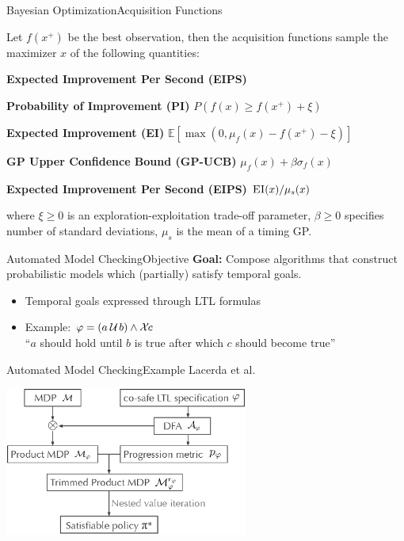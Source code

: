 \begin{frame}{Bayesian Optimization}{Acquisition Functions}

Let $f(x^+)$ be the best observation, then the acquisition functions sample the maximizer $x$ of the following quantities:

\begin{labeling}{\textbf{Expected Improvement Per Second (EIPS)}}
	\item[\textbf{Probability of Improvement (PI)}] $P(f(x) \geq f(x^+) + \xi)$
	\item[\textbf{Expected Improvement (EI)}] $\mathbb{E}[\max(0, \mu_f(x) - f(x^+) - \xi)]$
	\item[\textbf{GP Upper Confidence Bound (GP-UCB)}] $\mu_f(x) + \beta\sigma_f(x)$
	\item[\textbf{Expected Improvement Per Second (EIPS)}] $\textsc{EI}(x) / \mu_s(x)$
\end{labeling}

where $\xi \geq 0$ is an exploration-exploitation trade-off parameter, $\beta \geq 0$ specifies number of standard deviations, $\mu_s$ is the mean of a timing GP.
	
\end{frame}

\begin{frame}{Automated Model Checking}{Objective}
\textbf{Goal:} Compose algorithms that construct probabilistic models which (partially) satisfy temporal goals.

\begin{itemize}
	\item Temporal goals expressed through LTL formulas
	\item Example: $\varphi = (a \mathbin{\mathcal{U}\kern-.1em} b) \wedge \mathbin{\mathcal{X}\kern-.1em} c$ \\ ``$a$ should hold until $b$ is true after which $c$ should become true''
\end{itemize}
\end{frame}

\begin{frame}{Automated Model Checking}{Example Lacerda et al. \cite{lacerda2015optimal}}
	\begin{center}
		\includegraphics[width=0.6\textwidth]{figures/productMDP.eps}
	\end{center}
\end{frame}

